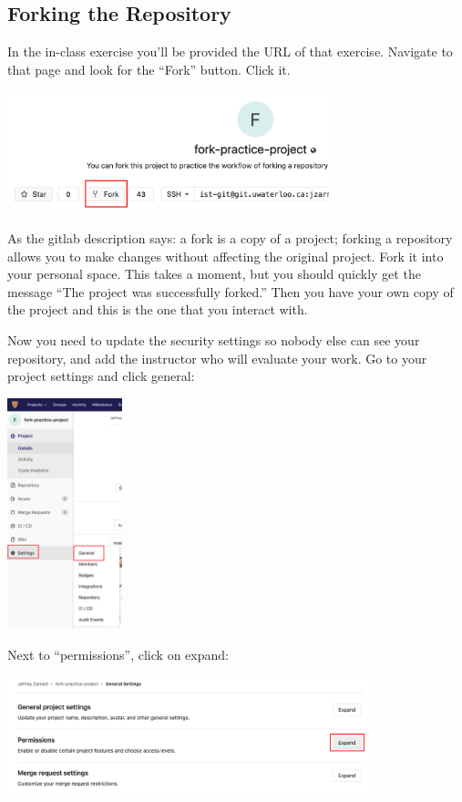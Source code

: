 \subsection*{Forking the Repository}
In the in-class exercise you'll be provided the URL of that exercise. Navigate to that page and look for the ``Fork'' button. Click it.

\begin{center}
	\includegraphics[width=0.7\textwidth]{images/gitlab-fork.png}
\end{center}

As the gitlab description says: a fork is a copy of a project; forking a repository allows you to make changes without affecting the original project. Fork it into your personal space. This takes a moment, but you should quickly get the message ``The project was successfully forked.'' Then you have your own copy of the project and this is the one that you interact with.

Now you need to update the security settings so nobody else can see your repository, and add the instructor who will evaluate your work. Go to your project settings and click general:

\begin{center}
	\includegraphics[width=0.25\textwidth]{images/gitlab-settings.png}
\end{center}

Next to ``permissions'', click on expand:

\begin{center}
	\includegraphics[width=0.8\textwidth]{images/gitlab-settings2.png}
\end{center}

